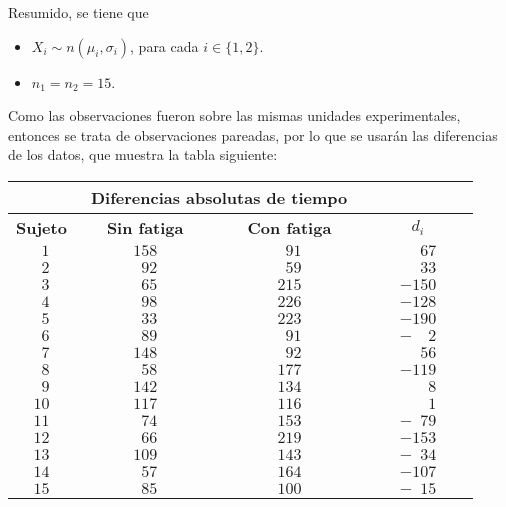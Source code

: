 \begin{solucion}
 \begin{datos}
  Resumido, se tiene que
  \begin{itemize}
   \item $X_i \sim n\left( \mu_i, \sigma_i \right)$,
   para cada $i \in \{ 1, 2 \}$.
   \item $n_1 = n_2 = 15$.
  \end{itemize}
  Como las observaciones fueron sobre las mismas unidades
  experimentales, entonces se trata de observaciones pareadas,
  por lo que se usar\'an las diferencias de los datos,
  que muestra la tabla siguiente:
  \begin{center}
   \begin{tabular}{cccc}
    & \multicolumn{2}{c}{\textbf{Diferencias absolutas de tiempo}}
    & \\
    \hline 
    \textbf{Sujeto} & $\phantom{000}$\textbf{Sin fatiga}$
    \phantom{000}$ & $\phantom{000}$\textbf{Con fatiga}$
    \phantom{000}$ & $\phantom{00000}d_i\phantom{00000}$ \\
    \hline 
    $\phantom{1}1$ & $158$ & $\phantom{1}91$ &
    $\phantom{-1}67$ \\
    $\phantom{1}2$ & $\phantom{1}92$ & $\phantom{1}59$ &
    $\phantom{-1}33$ \\
    $\phantom{1}3$ &  $\phantom{1}65$ & $215$ & $-150$  \\
    $\phantom{1}4$ & $\phantom{1}98$ & $226$ & $-128$ \\
    $\phantom{1}5$ &  $\phantom{1}33$ & $223$ & $-190$ \\
    $\phantom{1}6$ & $\phantom{1}89$ & $\phantom{1}91$ &
    $-\phantom{15}2$ \\
    $\phantom{1}7$ & $148$ & $\phantom{1}92$ & $\phantom{-1}56$ \\
    $\phantom{1}8$ & $\phantom{1}58$ & $177$ & $-119$ \\
    $\phantom{1}9$ & $142$ & $134$ & $\phantom{-15}8$ \\
    $10$ & $117$ & $116$ & $\phantom{-15}1$ \\
    $11$ & $\phantom{1}74$ & $153$ & $-\phantom{1}79$ \\
    $12$ & $\phantom{1}66$ & $219$ & $-153$ \\
    $13$ & $109$ & $143$ & $-\phantom{1}34$ \\
    $14$ & $\phantom{1}57$ & $164$ & $-107$ \\
    $15$ & $\phantom{1}85$ & $100$ & $-\phantom{5}15$
   \end{tabular}

\end{center}
\end{datos}
\end{solucion}
